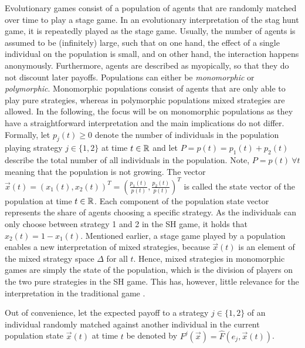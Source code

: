 \label{sec:evolutionarystaghunt}
Evolutionary games consist of a population of agents that are randomly matched 
over time to play a stage game. In an evolutionary interpretation of the
stag hunt game, it is repeatedly played as the stage game.
Usually, the number of agents is assumed to be (infinitely) large, 
such that on one hand, the effect of a single individual 
on the population is small, and on 
other hand, the interaction happens anonymously.
Furthermore, agents are described as myopically, so that they do not 
discount later payoffs.
Populations can either be \textit{monomorphic} or \textit{polymorphic}.
Monomorphic populations consist of agents that are only able to play pure
strategies, whereas in polymorphic populations mixed strategies are allowed.
In the following, the focus will be on monomorphic populations as they have
a straightforward interpretation and the main implications do not differ. 
Formally, let $p_j(t) \geq 0$ denote the number of individuals in 
the population playing strategy $j \in \{1,2\}$ at time $t \in \mathbb{R}$ and 
let $P = p(t) = p_1(t) + p_2(t)$ describe the total number of all individuals 
in the population. Note, $P =p(t)\ \forall t$ meaning that the population 
is not growing. The vector $\vec{x}(t) = \left(x_1(t),x_2(t)\right)^T
=\left(\frac{p_1(t)}{p(t)},\frac{p_2(t)}{p(t)}\right)^T$ is called the state 
vector of the population at time $t \in \mathbb{R}$. 
Each component of the population state vector represents the share of agents 
choosing a specific strategy. As the individuals can only choose between 
strategy 1 and 2 in the SH game, it holds that  $x_2(t) = 1-x_1(t)$. 
Mentioned earlier, a stage game played by a population enables a 
new interpretation of mixed strategies, because $\vec{x}(t)$ is an 
element of the mixed strategy space $\Delta$ for all $t$.
Hence, mixed strategies in monomorphic games are simply the state
of the population, which is the division of players on the two
pure strategies in the SH game. 
This has, however, little relevance for the interpretation
in the traditional game \parencite[914-915]{rubinstein_comments_1991}.

Out of convenience, let the expected payoff 
to a strategy $j \in \{1,2\}$ of an individual randomly matched
against another individual in the current population state $\vec{x}(t)$ 
at time $t$ be denoted by $F^j(\vec{x}) = \hat{F}(e_j,\vec{x}(t))$. 

